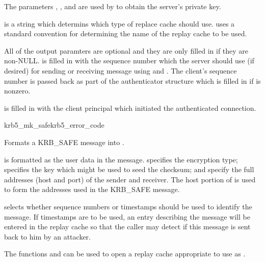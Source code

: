 The parameters , , and
 are used by  to obtain the
server's private key.

 is a string which determins which type of replace
cache  should use.  
uses a standard convention for determining the name of the replay cache
to be used.

All of the output paramters are optional and they are only filled in if
they are non-NULL.   is filled in with the
sequence number which the server should use (if desired) for sending or
receiving message using  and
.   The client's sequence number is passed back
as part of the authenticator structure which is filled in if
 is nonzero.  

 is filled in with the client principal which
initiated the authenticated connection.

\begin{funcdecl}{krb5_mk_safe}{krb5_error_code}{\funcin}
\funcout
{}
\end{funcdecl}

Formats a KRB_SAFE message into .

 is formatted as the user data in the message.
 specifies the encryption type; 
specifies the key which might be used to seed the checksum;
 and  specify the full
addresses (host and port) of the sender and receiver.  The host portion
of  is used to form the addresses used in the
KRB_SAFE message.

 selects whether sequence numbers or timestamps
should be used to identify the message.  If timestamps are to be used,
an entry describing the message will be entered in the replay cache
 so that the caller may detect if this message is sent
back to him by an attacker.

The functions  and
 can be used to open a replay cache
appropriate to use as .


